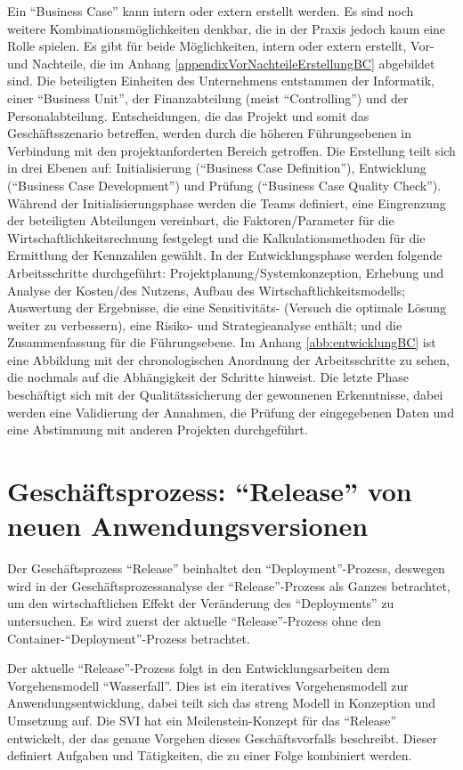 Ein \enquote{Business Case} kann intern oder extern erstellt werden. Es sind noch weitere Kombinationsmöglichkeiten denkbar, die in der Praxis jedoch kaum eine Rolle spielen.\autocite[vgl.][S.\,33]{brugger_it_2009} Es gibt für beide Möglichkeiten, intern oder extern erstellt, Vor- und Nachteile, die im Anhang \vref{appendixVorNachteileErstellungBC} abgebildet sind. Die beteiligten Einheiten des Unternehmens entstammen der Informatik, einer \enquote{Business Unit}, der Finanzabteilung (meist \enquote{Controlling}) und der Personalabteilung. Entscheidungen, die das Projekt und somit das Geschäftsszenario betreffen, werden durch die höheren Führungsebenen in Verbindung mit den projektanforderten Bereich getroffen. Die Erstellung teilt sich in drei Ebenen auf: Initialisierung (\enquote{Business Case Definition}), Entwicklung (\enquote{Business Case Development}) und Prüfung (\enquote{Business Case Quality Check}).\autocite[vgl.][S.\,41-42]{brugger_it_2009} Während der Initialisierungsphase werden die Teams definiert, eine Eingrenzung der beteiligten Abteilungen vereinbart, die Faktoren/Parameter für die Wirtschaftlichkeitsrechnung festgelegt und die Kalkulationsmethoden für die Ermittlung der Kennzahlen gewählt. In der Entwicklungsphase werden folgende Arbeitsschritte durchgeführt: Projektplanung/Systemkonzeption, Erhebung und Analyse der Kosten/des Nutzens, Aufbau des Wirtschaftlichkeitsmodells; Auswertung der Ergebnisse, die eine Sensitivitäts- (Versuch die optimale Lösung weiter zu verbessern), eine Risiko- und Strategieanalyse enthält; und die Zusammenfassung für die Führungsebene. Im Anhang \vref{abb:entwicklungBC} ist eine Abbildung mit der chronologischen Anordnung der Arbeitsschritte zu sehen, die nochmals auf die Abhängigkeit der Schritte hinweist. Die letzte Phase beschäftigt sich mit der Qualitätssicherung der gewonnenen Erkenntnisse, dabei werden eine Validierung der Annahmen, die Prüfung der eingegebenen Daten und eine Abstimmung mit anderen Projekten durchgeführt. 

\section{Geschäftsprozess: \enquote{Release} von neuen Anwendungsversionen}
Der Geschäftsprozess \enquote{Release} beinhaltet den \enquote{Deployment}-Prozess, deswegen wird in der Geschäftsprozessanalyse der \enquote{Release}-Prozess als Ganzes betrachtet, um den wirtschaftlichen Effekt der Veränderung des \enquote{Deployments} zu untersuchen. Es wird zuerst der aktuelle \enquote{Release}-Prozess  ohne den Container-\enquote{Deployment}-Prozess betrachtet.
\par
Der aktuelle \enquote{Release}-Prozess folgt in den Entwicklungsarbeiten dem Vorgehensmodell \enquote{Wasserfall}. Dies ist ein iteratives Vorgehensmodell zur Anwendungsentwicklung, dabei teilt sich das streng Modell in Konzeption und Umsetzung auf.\autocite[vgl.][S.\,24]{freund_praxishandbuch_2017} Die \ac{SVI} hat ein Meilenstein-Konzept für das \enquote{Release} entwickelt, der das genaue Vorgehen dieses Geschäftsvorfalls beschreibt. Dieser definiert Aufgaben und Tätigkeiten, die zu einer Folge kombiniert werden. 

